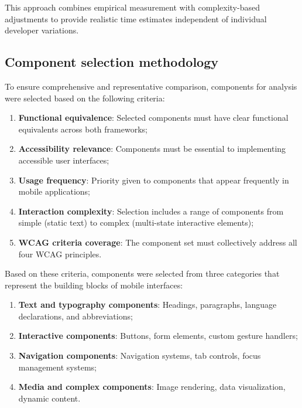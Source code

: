 This approach combines empirical measurement with complexity-based adjustments to provide realistic time estimates independent of individual developer variations.

\subsection{Component selection methodology}

To ensure comprehensive and representative comparison, components for analysis were selected based on the following criteria:

\begin{enumerate}
    \item \textbf{Functional equivalence}: Selected components must have clear functional equivalents across both frameworks;
    
    \item \textbf{Accessibility relevance}: Components must be essential to implementing accessible user interfaces;
    
    \item \textbf{Usage frequency}: Priority given to components that appear frequently in mobile applications;
    
    \item \textbf{Interaction complexity}: Selection includes a range of components from simple (static text) to complex (multi-state interactive elements);
    
    \item \textbf{WCAG criteria coverage}: The component set must collectively address all four WCAG principles.
\end{enumerate}

Based on these criteria, components were selected from three categories that represent the building blocks of mobile interfaces:

\begin{enumerate}
    \item \textbf{Text and typography components}: Headings, paragraphs, language declarations, and abbreviations;
    
    \item \textbf{Interactive components}: Buttons, form elements, custom gesture handlers;
    
    \item \textbf{Navigation components}: Navigation systems, tab controls, focus management systems;
    
    \item \textbf{Media and complex components}: Image rendering, data visualization, dynamic content.
\end{enumerate}

